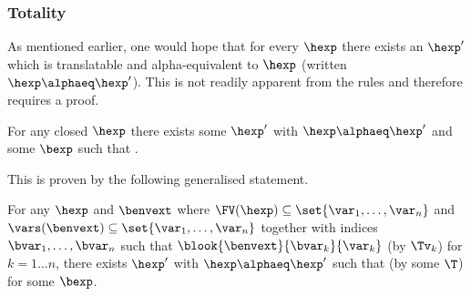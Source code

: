\subsubsection{Totality}

As mentioned earlier, one would hope that for every $\hexp$ there exists an $\hexp'$ which is translatable and alpha-equivalent to $\hexp$ (written $\hexp \alphaeq \hexp'$).
This is not readily apparent from the rules and therefore requires a proof.

\begin{theorem}[Totality]
For any closed $\hexp$ there exists some $\hexp'$ with $\hexp \alphaeq \hexp'$ and some $\bexp$ such that .
\end{theorem}

This is proven by the following generalised statement.

\begin{lemma}
For any $\hexp$ and $\benvext$ where $\FV(\hexp) \subseteq \set{\var_1, \ldots, \var_n}$ and $\vars(\benvext) \subseteq \set{\var_1, \ldots, \var_n}$ together with indices $\bvar_1, \ldots, \bvar_n$ such that $\blook{\benvext}{\bvar_k}{\var_k}$ (by $\Tv_k$) for $k = 1 \ldots n$, there exists $\hexp'$ with $\hexp \alphaeq \hexp'$ such that  (by some $\T$) for some $\bexp$.
\end{lemma}

